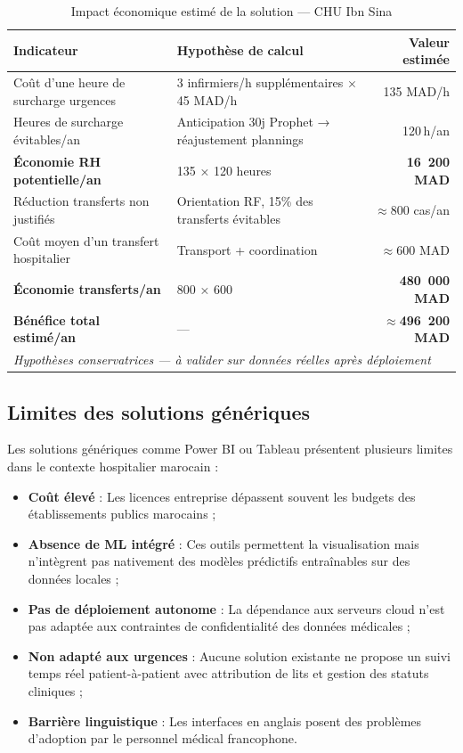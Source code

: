 \documentclass[12pt,a4paper]{report}
\begin{document}
	\begin{table}[H]
		\centering
		\caption{Impact économique estimé de la solution — CHU Ibn Sina}
		\renewcommand{\arraystretch}{1.2}
		\begin{tabularx}{\textwidth}{lXr}
			\toprule
			\textbf{Indicateur} & \textbf{Hypothèse de calcul} & \textbf{Valeur estimée} \\
			\midrule
			Coût d'une heure de surcharge urgences
			& 3 infirmiers/h supplémentaires $\times$ 45 MAD/h
			& 135 MAD/h \\
			Heures de surcharge évitables/an
			& Anticipation 30j Prophet → réajustement plannings
			& 120\,h/an \\
			\textbf{Économie RH potentielle/an}
			& 135 × 120 heures
			& \textbf{16~200 MAD} \\
			Réduction transferts non justifiés
			& Orientation RF, 15\% des transferts évitables
			& $\approx$800 cas/an \\
			Coût moyen d'un transfert hospitalier
			& Transport + coordination
			& $\approx$600 MAD \\
			\textbf{Économie transferts/an}
			& 800 × 600
			& \textbf{480~000 MAD} \\
			\midrule
			\textbf{Bénéfice total estimé/an} & — & \textbf{$\approx$496~200 MAD} \\
			\bottomrule
			\multicolumn{3}{l}{\textit{Hypothèses conservatrices — à valider sur données réelles après déploiement}} \\
		\end{tabularx}
	\end{table}
	\newpage
	\subsection{Limites des solutions génériques}
	
	Les solutions génériques comme Power BI ou Tableau présentent plusieurs limites dans
	le contexte hospitalier marocain :
	
	\begin{itemize}
		\item \textbf{Coût élevé} : Les licences entreprise dépassent souvent les budgets
		des établissements publics marocains ;
		\item \textbf{Absence de ML intégré} : Ces outils permettent la visualisation mais
		n'intègrent pas nativement des modèles prédictifs entraînables sur des données locales ;
		\item \textbf{Pas de déploiement autonome} : La dépendance aux serveurs cloud n'est
		pas adaptée aux contraintes de confidentialité des données médicales ;
		\item \textbf{Non adapté aux urgences} : Aucune solution existante ne propose un
		suivi temps réel patient-à-patient avec attribution de lits et gestion des statuts cliniques ;
		\item \textbf{Barrière linguistique} : Les interfaces en anglais posent des problèmes
		d'adoption par le personnel médical francophone.
	\end{itemize}
	
\end{document}
